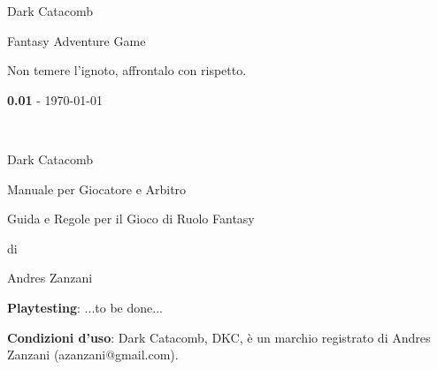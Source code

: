 \documentclass[12pt,a4paper,twoside,openany]{book}
\begin{document}
	
\def \versione {0.01}
\thispagestyle{empty}
 
{\Huge \begin{center}
		Dark Catacomb
\end{center}}

\vfill
\begin{center}
	\Large{\color{black} Fantasy Adventure Game}
\end{center}

\pagebreak

	
\bigskip
Non temere l'ignoto, affrontalo con rispetto.
	
	\vspace{\fill}
\begin{center}\textbf{\versione} - \today\end{center}
\thispagestyle{empty}


\newpage~\thispagestyle{empty}%


\newcommand{\riga}{\rule{\textwidth}{0.4pt}}


{\Huge \begin{center} Dark Catacomb\end{center}}

\bigskip

\begin{center}{\LARGE Manuale per Giocatore e Arbitro}\\ \end{center}

{\large \begin{center} Guida e Regole per il Gioco di Ruolo Fantasy \end{center}}

\begin{center}di \end{center}

{\LARGE \begin{center} Andres Zanzani \end{center}}

\vspace{2cm}


\vfill

\begin{mdframed}[roundcorner=10pt]

\medskip

\textbf{Playtesting}: ...to be done...

\bigskip

\begin{flushleft}\textbf{Condizioni d'uso}: Dark Catacomb, DKC, è un marchio registrato di Andres Zanzani (azanzani@gmail.com).
\end{flushleft}

\vspace{0.5cm}


\medskip

\end{mdframed}
\end{document}
